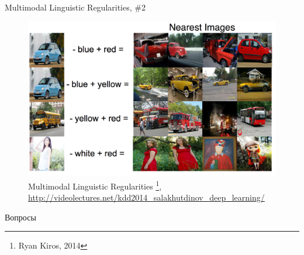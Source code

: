 \documentclass[10pt]{beamer}
\begin{document}
\begin{frame}{Multimodal Linguistic Regularities, \#2}

\begin{figure}[h!]
	\centering
	\includegraphics[width=1\textwidth]{images/mlr2.png}
	\caption{Multimodal Linguistic Regularities \footnote{Ryan Kiros, 2014},\\ \url{http://videolectures.net/kdd2014_salakhutdinov_deep_learning/}}
\end{figure} 

\end{frame}


\begin{frame}[plain]
\begin{center}
{\Large Вопросы}
\end{center}
\end{frame}
\end{document}
